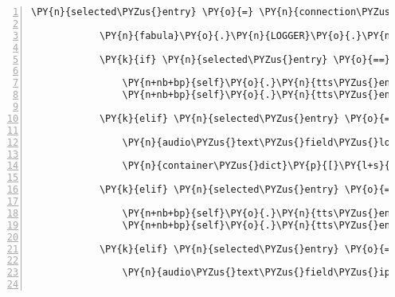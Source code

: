 \begin{Verbatim}[commandchars=\\\{\},numbers=left,firstnumber=1,stepnumber=1]
            \PY{n}{selected\PYZus{}entry} \PY{o}{=} \PY{n}{connection\PYZus{}details\PYZus{}menu}\PY{o}{.}\PY{n}{list}\PY{p}{[}\PY{n}{connection\PYZus{}details\PYZus{}menu}\PY{o}{.}\PY{n}{list\PYZus{}index}\PY{p}{]}

            \PY{n}{fabula}\PY{o}{.}\PY{n}{LOGGER}\PY{o}{.}\PY{n}{debug}\PY{p}{(}\PY{l+s}{\PYZdq{}}\PY{l+s}{Entry selected: \PYZob{}\PYZcb{}}\PY{l+s}{\PYZdq{}}\PY{o}{.}\PY{n}{format}\PY{p}{(}\PY{n}{selected\PYZus{}entry}\PY{p}{)}\PY{p}{)}

            \PY{k}{if} \PY{n}{selected\PYZus{}entry} \PY{o}{==} \PY{l+s}{\PYZdq{}}\PY{l+s}{Login name}\PY{l+s}{\PYZdq{}}\PY{p}{:}

                \PY{n+nb+bp}{self}\PY{o}{.}\PY{n}{tts\PYZus{}engine}\PY{o}{.}\PY{n}{say}\PY{p}{(}\PY{n}{container\PYZus{}dict}\PY{p}{[}\PY{l+s}{\PYZsq{}}\PY{l+s}{login\PYZus{}name}\PY{l+s}{\PYZsq{}}\PY{p}{]}\PY{p}{)}
                \PY{n+nb+bp}{self}\PY{o}{.}\PY{n}{tts\PYZus{}engine}\PY{o}{.}\PY{n}{runAndWait}\PY{p}{(}\PY{p}{)}

            \PY{k}{elif} \PY{n}{selected\PYZus{}entry} \PY{o}{==} \PY{l+s}{\PYZdq{}}\PY{l+s}{Enter new login}\PY{l+s}{\PYZdq{}}\PY{p}{:}

                \PY{n}{audio\PYZus{}text\PYZus{}field\PYZus{}login}\PY{o}{.}\PY{n}{focus\PYZus{}audio\PYZus{}text\PYZus{}field}\PY{p}{(}\PY{p}{)}

                \PY{n}{container\PYZus{}dict}\PY{p}{[}\PY{l+s}{\PYZsq{}}\PY{l+s}{login\PYZus{}name}\PY{l+s}{\PYZsq{}}\PY{p}{]} \PY{o}{=} \PY{n}{audio\PYZus{}text\PYZus{}field\PYZus{}login}\PY{o}{.}\PY{n}{process\PYZus{}key\PYZus{}input}\PY{p}{(}\PY{p}{)}

            \PY{k}{elif} \PY{n}{selected\PYZus{}entry} \PY{o}{==} \PY{l+s}{\PYZdq{}}\PY{l+s}{IP address}\PY{l+s}{\PYZdq{}}\PY{p}{:}

                \PY{n+nb+bp}{self}\PY{o}{.}\PY{n}{tts\PYZus{}engine}\PY{o}{.}\PY{n}{say}\PY{p}{(}\PY{n}{container\PYZus{}dict}\PY{p}{[}\PY{l+s}{\PYZsq{}}\PY{l+s}{connector}\PY{l+s}{\PYZsq{}}\PY{p}{]}\PY{p}{)}
                \PY{n+nb+bp}{self}\PY{o}{.}\PY{n}{tts\PYZus{}engine}\PY{o}{.}\PY{n}{runAndWait}\PY{p}{(}\PY{p}{)}

            \PY{k}{elif} \PY{n}{selected\PYZus{}entry} \PY{o}{==} \PY{l+s}{\PYZdq{}}\PY{l+s}{Enter new IP address}\PY{l+s}{\PYZdq{}}\PY{p}{:}

                \PY{n}{audio\PYZus{}text\PYZus{}field\PYZus{}ip\PYZus{}address}\PY{o}{.}\PY{n}{focus\PYZus{}audio\PYZus{}text\PYZus{}field}\PY{p}{(}\PY{p}{)}


\end{Verbatim}
